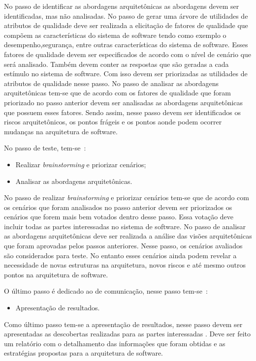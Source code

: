 No passo de identificar as abordagens arquitetônicas  as abordagens devem ser identificadas, mas não analisadas. No passo de gerar uma árvore de utilidades de atributos de qualidade deve ser realizada a elicitação de fatores de qualidade  que compõem as características do sistema de software tendo como exemplo o desempenho,segurança, entre outras características do sistema de software. Esses fatores de qualidade devem ser especificados de acordo com o nível de cenário que será analisado. Também devem conter as respostas que são geradas a cada estímulo no sistema de software. Com isso  devem ser priorizadas as utilidades de atributos de qualidade nesse passo.
No passo de analisar as abordagens arquitetônicas tem-se que de acordo com os fatores de qualidade que foram priorizado no passo anterior devem ser analisadas as abordagens arquitetônicas que possuem esses fatores. Sendo assim, nesse passo devem ser identificados os riscos arquitetônicos, os pontos frágeis e os pontos aonde podem ocorrer mudanças na arquitetura de software.
    
No passo de teste, tem-se~\cite{ATAM}:

\begin{itemize}
    \item Realizar \emph{brainstorming} e priorizar cenários;
    \item Analisar as abordagens arquitetônicas. 
\end{itemize}

No passo de realizar \emph{brainstorming} e priorizar cenários tem-se que de acordo com os cenários que foram analisados no passo anterior devem ser priorizados os cenários que forem mais bem votados dentro desse passo. Essa votação deve incluir todas as partes interessadas no sistema de software. No passo de analisar as abordagens arquitetônicas deve ser realizada  a análise das visões arquitetônicas que foram aprovadas pelos passos anteriores. Nesse passo, os cenários avaliados são considerados para teste. No entanto esses cenários ainda podem revelar a necessidade de novas estruturas na arquitetura, novos riscos e até mesmo outros pontos na arquitetura de software.
    

O último passo é dedicado ao de comunicação, nesse passo tem-se~\cite{ATAM}:

\begin{itemize}
    \item Apresentação de resultados.
\end{itemize}

Como último passo tem-se a apresentação de resultados, nesse passo devem ser apresentadas as descobertas realizadas para as partes interessadas . Deve ser feito  um relatório com o detalhamento das informações que foram obtidas e as estratégias propostas para a arquitetura de software.
    
